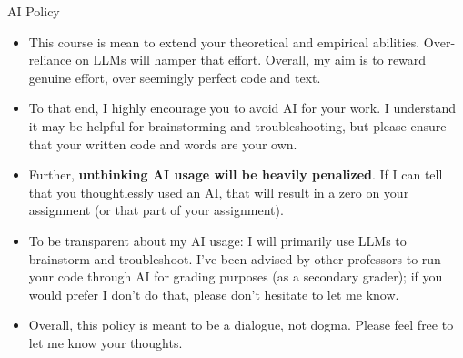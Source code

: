 \documentclass[compress, 8pt]{beamer}
\begin{document}
\begin{frame}{AI Policy}

\begin{itemize}
\item This course is mean to extend your theoretical and empirical abilities. 
Over-reliance on LLMs will hamper that effort. 
Overall, my aim is to reward genuine effort, over seemingly perfect code and text. 
\item To that end, I highly encourage you to avoid AI for your work. 
I understand it may be helpful for brainstorming and troubleshooting, but please ensure that your written code and words are your own. 

\item Further, \textbf{unthinking AI usage will be heavily penalized}. If I can tell that you thoughtlessly used an AI, that will result in a zero on your assignment (or that part of your assignment).

\item To be transparent about my AI usage: I will primarily use LLMs to brainstorm and troubleshoot. 
I've been advised by other professors to run your code through AI for grading purposes (as a secondary grader); if you would prefer I don't do that, please don't hesitate to let me know. 

\item Overall, this policy is meant to be a dialogue, not dogma. 
Please feel free to let me know your thoughts. 

\end{itemize}

\end{frame}
\end{document}
